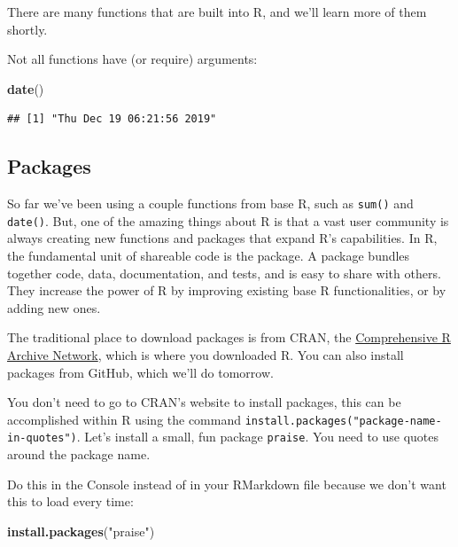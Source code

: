 \documentclass[]{book}
\newenvironment{Shaded}{\begin{snugshade}}{\end{snugshade}}
\newcommand{\KeywordTok}[1]{\textcolor[rgb]{0.13,0.29,0.53}{\textbf{#1}}}
\newcommand{\NormalTok}[1]{#1}
\newcommand{\OperatorTok}[1]{\textcolor[rgb]{0.81,0.36,0.00}{\textbf{#1}}}
\newcommand{\StringTok}[1]{\textcolor[rgb]{0.31,0.60,0.02}{#1}}
\begin{document}
\begin{Shaded}
\end{Shaded}

There are many functions that are built into R, and we'll learn more of them shortly.

Not all functions have (or require) arguments:

\begin{Shaded}
\begin{Highlighting}[]
\KeywordTok{date}\NormalTok{()}
\end{Highlighting}
\end{Shaded}

\begin{verbatim}
## [1] "Thu Dec 19 06:21:56 2019"
\end{verbatim}

\hypertarget{packages}{%
\subsection{Packages}\label{packages}}

So far we've been using a couple functions from base R, such as \texttt{sum()} and \texttt{date()}. But, one of the amazing things about R is that a vast user community is always creating new functions and packages that expand R's capabilities. In R, the fundamental unit of shareable code is the package. A package bundles together code, data, documentation, and tests, and is easy to share with others. They increase the power of R by improving existing base R functionalities, or by adding new ones.

The traditional place to download packages is from CRAN, the \href{https://cran.r-project.org/}{Comprehensive R Archive Network}, which is where you downloaded R. You can also install packages from GitHub, which we'll do tomorrow.

You don't need to go to CRAN's website to install packages, this can be accomplished within R using the command \texttt{install.packages("package-name-in-quotes")}. Let's install a small, fun package \texttt{praise}. You need to use quotes around the package name.

Do this in the Console instead of in your RMarkdown file because we don't want this to load every time:

\begin{Shaded}
\begin{Highlighting}[]
\KeywordTok{install.packages}\NormalTok{(}\StringTok{"praise"}\NormalTok{)}
\end{Highlighting}
\end{Shaded}
\end{document}
